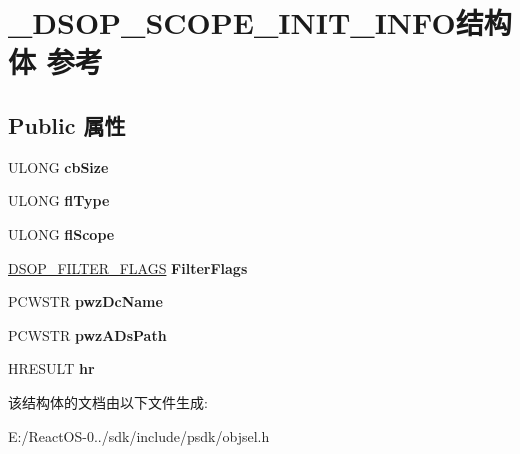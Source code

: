\hypertarget{struct___d_s_o_p___s_c_o_p_e___i_n_i_t___i_n_f_o}{}\section{\+\_\+\+D\+S\+O\+P\+\_\+\+S\+C\+O\+P\+E\+\_\+\+I\+N\+I\+T\+\_\+\+I\+N\+F\+O结构体 参考}
\label{struct___d_s_o_p___s_c_o_p_e___i_n_i_t___i_n_f_o}
\subsection*{Public 属性}
\begin{DoxyCompactItemize}
\item 
\mbox{\label{struct___d_s_o_p___s_c_o_p_e___i_n_i_t___i_n_f_o_a8d9b5af53ef984fc454158c071e6b11a}} 
U\+L\+O\+NG {\bfseries cb\+Size}
\item 
\mbox{\label{struct___d_s_o_p___s_c_o_p_e___i_n_i_t___i_n_f_o_ae3e5e098326007bcccaec20e2fce67f2}} 
U\+L\+O\+NG {\bfseries fl\+Type}
\item 
\mbox{\label{struct___d_s_o_p___s_c_o_p_e___i_n_i_t___i_n_f_o_a4a32f9961de5f7554b18c115d31ac881}} 
U\+L\+O\+NG {\bfseries fl\+Scope}
\item 
\mbox{\label{struct___d_s_o_p___s_c_o_p_e___i_n_i_t___i_n_f_o_a7b81d864c735ed1938486e9464fb4400}} 
\hyperlink{struct___d_s_o_p___f_i_l_t_e_r___f_l_a_g_s}{D\+S\+O\+P\+\_\+\+F\+I\+L\+T\+E\+R\+\_\+\+F\+L\+A\+GS} {\bfseries Filter\+Flags}
\item 
\mbox{\label{struct___d_s_o_p___s_c_o_p_e___i_n_i_t___i_n_f_o_a722335a37fde21f516ed0d14c1ea0577}} 
P\+C\+W\+S\+TR {\bfseries pwz\+Dc\+Name}
\item 
\mbox{\label{struct___d_s_o_p___s_c_o_p_e___i_n_i_t___i_n_f_o_a49596376048800f0427e438ad03a4001}} 
P\+C\+W\+S\+TR {\bfseries pwz\+A\+Ds\+Path}
\item 
\mbox{\label{struct___d_s_o_p___s_c_o_p_e___i_n_i_t___i_n_f_o_a1b657cdf6fca66aaef2faf11fb0b7090}} 
H\+R\+E\+S\+U\+LT {\bfseries hr}
\end{DoxyCompactItemize}


该结构体的文档由以下文件生成\+:\begin{DoxyCompactItemize}
\item 
E\+:/\+React\+O\+S-\/0../sdk/include/psdk/objsel.\+h\end{DoxyCompactItemize}
